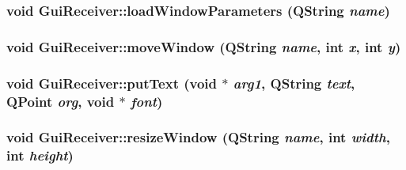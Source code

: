 \label{classGuiReceiver_a9f788023836b17e8aed97b3770386ea9}
\hypertarget{classGuiReceiver_afc852e63d8d8e4158984d37a444927ee}{
\subsubsection[{loadWindowParameters}]{\setlength{\rightskip}{0pt plus 5cm}void GuiReceiver::loadWindowParameters (QString {\em name})}}
\label{classGuiReceiver_afc852e63d8d8e4158984d37a444927ee}
\hypertarget{classGuiReceiver_abb7e0a41c2db119bfd76906651feb5aa}{
\subsubsection[{moveWindow}]{\setlength{\rightskip}{0pt plus 5cm}void GuiReceiver::moveWindow (QString {\em name}, \/  int {\em x}, \/  int {\em y})}}
\label{classGuiReceiver_abb7e0a41c2db119bfd76906651feb5aa}
\hypertarget{classGuiReceiver_a9d6fca288ed9086e22ad5d85ef0a3ae3}{
\subsubsection[{putText}]{\setlength{\rightskip}{0pt plus 5cm}void GuiReceiver::putText (void $\ast$ {\em arg1}, \/  QString {\em text}, \/  QPoint {\em org}, \/  void $\ast$ {\em font})}}
\label{classGuiReceiver_a9d6fca288ed9086e22ad5d85ef0a3ae3}
\hypertarget{classGuiReceiver_a42b8802376fe8f63922969475875eea6}{
\subsubsection[{resizeWindow}]{\setlength{\rightskip}{0pt plus 5cm}void GuiReceiver::resizeWindow (QString {\em name}, \/  int {\em width}, \/  int {\em height})}}
